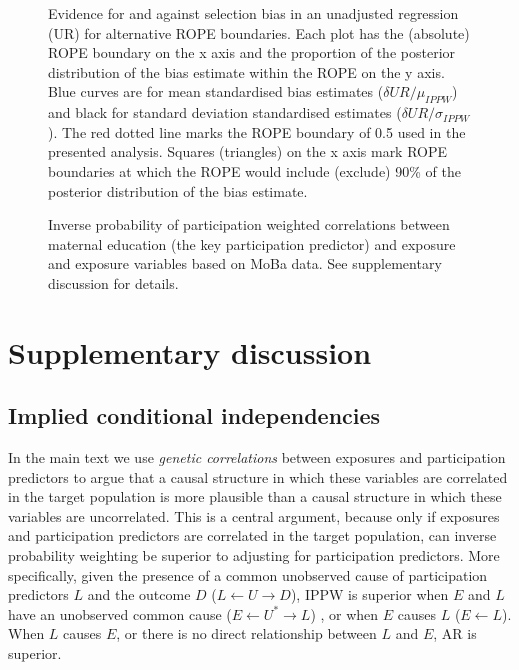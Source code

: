\documentclass[12pt]{article}
\begin{document}
\begin{figure}[H]
	\centering 
	\caption{Evidence for and against selection bias in an unadjusted regression (UR) for alternative ROPE boundaries. Each plot has the (absolute) ROPE boundary on the x axis and the proportion of the posterior distribution of the bias estimate within the ROPE on the y axis. Blue curves are for mean standardised bias estimates ($\delta{UR}/\mu_{IPPW}$) and black for standard deviation standardised estimates ($\delta{UR}/\sigma_{IPPW}$). The red dotted line marks the ROPE boundary of 0.5 used in the presented analysis. Squares (triangles) on the x axis mark ROPE boundaries at which the ROPE would include (exclude) 90\% of the posterior distribution of the bias estimate.}
	\label{fig:ropeplotsUR}
\end{figure}

\begin{figure}[H]
	\centering 
	\caption{Inverse probability of participation weighted correlations between maternal education (the key participation predictor) and exposure and exposure variables based on MoBa data. See supplementary discussion for details.}
	\label{fig:educors}
\end{figure}

\newpage

\section{Supplementary discussion}
\subsection{Implied conditional independencies}
In the main text we use \emph{genetic correlations} between exposures and participation predictors to argue that a causal structure in which these variables are correlated in the target population is more plausible than a causal structure in which these variables are uncorrelated. This is a central argument, because only if exposures and participation predictors are correlated in the target population, can inverse probability weighting be superior to adjusting for participation predictors. More specifically, given the presence of a common unobserved cause of participation predictors $L$ and the outcome $D$ ($L \leftarrow U \rightarrow D$), IPPW is superior when $E$ and $L$ have an unobserved common cause ($E \leftarrow U^* \rightarrow L$) , or when $E$ causes $L$ ($E \leftarrow L$). When $L$ causes $E$, or there is no direct relationship between $L$ and $E$, AR is superior.
\end{document}
